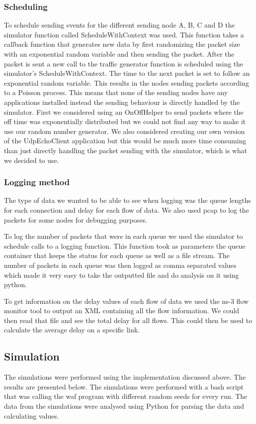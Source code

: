 \documentclass{article}
\begin{document}
\subsubsection{Scheduling}
To schedule sending events for the different sending node A, B, C and D the simulator function called ScheduleWithContext was used.
This function takes a callback function that generates new data by first randomizing the packet size with an exponential random variable and then sending the packet.
After the packet is sent a new call to the traffic generator function is scheduled using the simulator's ScheduleWithContext.
The time to the next packet is set to follow an exponential random variable.
This results in the nodes sending packets according to a Poisson process.
This means that none of the sending nodes have any applications installed instead the sending behaviour is directly handled by the simulator.
First we considered using an OnOffHelper to send packets where the off time was exponentially distributed but we could not find any way to make it use our random number generator.
We also considered creating our own version of the UdpEchoClient application but this would be much more time consuming than just directly handling the packet sending with the simulator, which is what we decided to use.

\subsubsection{Logging method}
The type of data we wanted to be able to see when logging was the queue lengths for each connection and delay for each flow of data.
We also used pcap to log the packets for some nodes for debugging purposes.

To log the number of packets that were in each queue we used the simulator to schedule calls to a logging function.
This function took as parameters the queue container that keeps the status for each queue as well as a file stream.
The number of packets in each queue was then logged as comma separated values which made it very easy to take the outputted file and do analysis on it using python.

To get information on the delay values of each flow of data we used the ns-3 flow monitor tool to output an XML containing all the flow information.
We could then read that file and see the total delay for all flows.
This could then be used to calculate the average delay on a specific link.

\subsection{Simulation}
The simulations were performed using the implementation discussed above.
The results are presented below.
The simulations were performed with a bash script that was calling the waf program with different random seeds for every run.
The data from the simulations were analysed using Python for parsing the data and calculating values.
\end{document}
